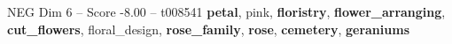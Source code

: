 \begin{textsample}{NEG Dim 6 – Score -8.00 – t008541}  \label{ex:f6_neg_030}
\textbf{petal}, pink, \textbf{floristry}, \textbf{flower\_arranging}, \textbf{cut\_flowers}, floral\_design, \textbf{rose\_family}, \textbf{rose}, \textbf{cemetery}, \textbf{geraniums}

\end{textsample}
